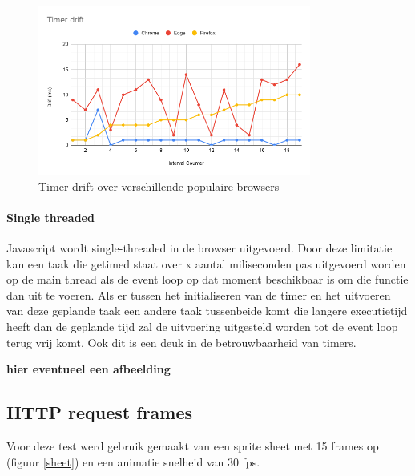 \begin{figure}[H]
\centering
\includegraphics[width=0.8\textwidth]{img/Timer drift.png}
\caption{Timer drift over verschillende populaire browsers} \label{drift}
\end{figure}

\paragraph{Single threaded}
Javascript wordt single-threaded in de browser uitgevoerd. Door deze limitatie kan een taak die getimed staat over x aantal miliseconden pas uitgevoerd worden op de main thread als de event loop op dat moment beschikbaar is om die functie dan uit te voeren. Als er tussen het initialiseren van de timer en het uitvoeren van deze geplande taak een andere taak tussenbeide komt die langere executietijd heeft dan de geplande tijd zal de uitvoering uitgesteld worden tot de event loop terug vrij komt. Ook dit is een deuk in de betrouwbaarheid van timers.

\textbf{hier eventueel een afbeelding}

\subsection{HTTP request frames}

Voor deze test werd gebruik gemaakt van een sprite sheet met 15 frames op (figuur \ref{sheet}) en een animatie snelheid van 30 fps.

